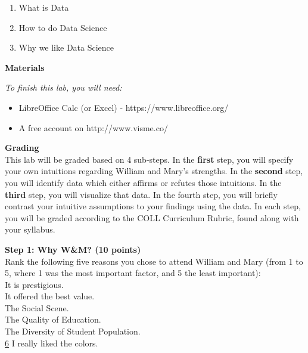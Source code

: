 \documentclass{article}
\begin{document}
\begin{enumerate}[leftmargin=15mm]

\item What is Data 
\item How to do Data Science 
\item Why we like Data Science

\end{enumerate}

\vspace{3mm}
\textbf{Materials}

\textit{To finish this lab, you will need:}
\begin{itemize}
\item LibreOffice Calc (or Excel) - https://www.libreoffice.org/
\item A free account on http://www.visme.co/
\end{itemize}

\vspace{3mm}
\textbf{Grading}\\
This lab will be graded based on 4 sub-steps.  In the \textbf{first} step, you will specify your own intuitions regarding William and Mary's strengths.  In the \textbf{second} step, you will identify data which either affirms or refutes those intuitions.  In the \textbf{third} step, you will visualize that data.  In the fourth step, you will briefly contrast your intuitive assumptions to your findings using the data.  In each step, you will be graded according to the COLL Curriculum Rubric, found along with your syllabus.

\vspace{3mm}
\textbf{Step 1: Why W\&M? (10 points)}\\
Rank the following five reasons you chose to attend William and Mary (from 1 to 5, where 1 was the most important factor, and 5 the least important):\\
\underline{\hspace{0.35cm}} It is prestigious.\\
\underline{\hspace{0.35cm}} It offered the best value.\\
\underline{\hspace{0.35cm}} The Social Scene. \\
\underline{\hspace{0.35cm}} The Quality of Education. \\
\underline{\hspace{0.35cm}} The Diversity of Student Population.\\
\underline{\hspace{0.05cm}}\underline{6}\underline{\hspace{0.1cm}}  I really liked the colors.\\
\end{document}

